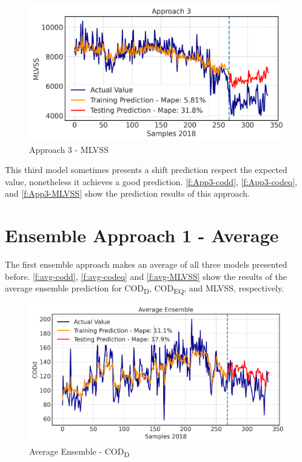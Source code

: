 \begin{figure}[h!]
\centering
\includegraphics[width=\linewidth]{figures/Ch5/MLVSS-approach3.pdf}
\caption{Approach 3 - MLVSS}
\label{f:App3-MLVSS}
\end{figure}



This third model sometimes presents a shift prediction respect the expected value, nonetheless it achieves a good prediction. \autoref{f:App3-codd}, \autoref{f:App3-codeq}, and \autoref{f:App3-MLVSS} show the prediction results of this approach. 
\clearpage

\section{Ensemble Approach 1 - Average}
The first ensemble approach makes an average of all three models presented before. \autoref{f:avg-codd}, \autoref{f:avg-codeq} and \autoref{f:avg-MLVSS} show the results of the average ensemble prediction for COD\textsubscript{D}, COD\textsubscript{EQ}, and MLVSS, respectively. 

\begin{figure}[h]
\centering
\includegraphics[width=\linewidth]{figures/Ch5/CODd-avg.pdf}
\caption{Average Ensemble - COD\textsubscript{D}}
\label{f:avg-codd}
\end{figure}

